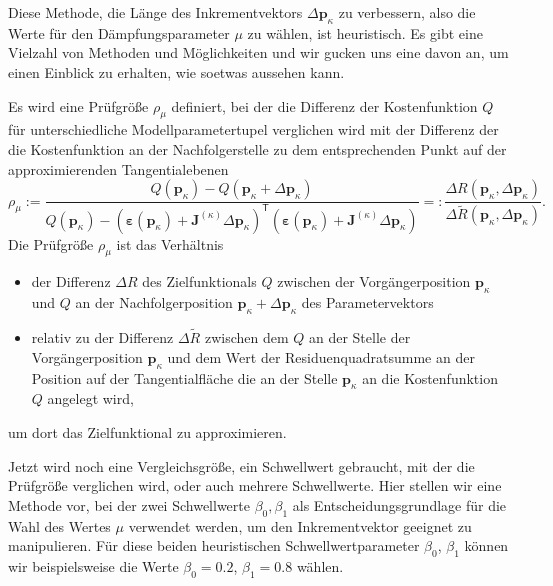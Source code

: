 Diese Methode, die  Länge des Inkrementvektors
$\Delta \mathbf{p}_\kappa$ zu verbessern, also die Werte für den
Dämpf\-ungs\-parameter $\mu$ zu wählen, ist heuristisch.
Es gibt eine Vielzahl von Methoden und Möglichkeiten und wir gucken uns
eine davon an, um einen Einblick zu erhalten, wie soetwas aussehen kann.

Es wird eine Prüfgröße $\rho_{\mu}$ definiert, bei der die Differenz der
Kostenfunktion $Q$ für unterschiedliche Modellparametertupel
verglichen wird mit der Differenz der die Kostenfunktion an der Nachfolgerstelle
zu dem entsprechenden Punkt auf der approximierenden Tangentialebenen
\begin{equation}
\rho_{\mu} :=\frac{Q(\mathbf{p}_\kappa) -
Q(\mathbf{p}_\kappa + \Delta \mathbf{p}_\kappa)}
{Q(\mathbf{p}_\kappa) -
\left( \boldsymbol \varepsilon (\mathbf{p}_\kappa)
    + \mathbf{J}^{(\kappa)} \Delta \mathbf{p}_\kappa \right)^\mathsf{T}
\left( \boldsymbol \varepsilon (\mathbf{p}_\kappa)
    + \mathbf{J}^{(\kappa)} \Delta \mathbf{p}_\kappa \right)  }
=:  \frac{\Delta R(\mathbf{p}_\kappa, \Delta \mathbf{p}_\kappa)}{\Delta \tilde{R}(\mathbf{p}_\kappa, \Delta \mathbf{p}_\kappa)} .
\label{DaempfTuning}
\end{equation}
Die Prüfgröße $\rho_{\mu}$ ist das Verhältnis
\begin{itemize}
\item der Differenz $\Delta R$ des Zielfunktionals $Q$ zwischen
der Vorgängerposition $\mathbf{p}_\kappa$ und $Q$ an der Nachfolgerposition
$\mathbf{p}_\kappa + \Delta \mathbf{p}_\kappa$
des Parametervektors
\item relativ zu der Differenz $\Delta \tilde{R}$ zwischen dem $Q$ an der
Stelle der Vorgängerposition $\mathbf{p}_\kappa$ und dem Wert der Residuenquadratsumme
an der Position auf der Tangentialfläche die an der
Stelle $\mathbf{p}_\kappa$ an die Kostenfunktion $Q$ angelegt wird,
\end{itemize}
um dort das Zielfunktional zu approximieren.

Jetzt wird noch eine Vergleichsgröße, ein Schwellwert gebraucht, mit der die
Prüfgröße verglichen wird, oder auch mehrere Schwellwerte. Hier stellen wir
eine Methode vor, bei der zwei Schwellwerte $\beta_0, \beta_1$ als
Ent\-scheid\-ungs\-grund\-lage für die Wahl des
Wertes $\mu$ verwendet werden, um den Inkrementvektor geeignet zu manipulieren.
Für diese beiden heuristischen Schwell\-wert\-para\-meter $\beta_0$, $\beta_1$
können wir beispielsweise die Werte $\beta_0 = 0.2$, $\beta_1 = 0.8$ wählen.

